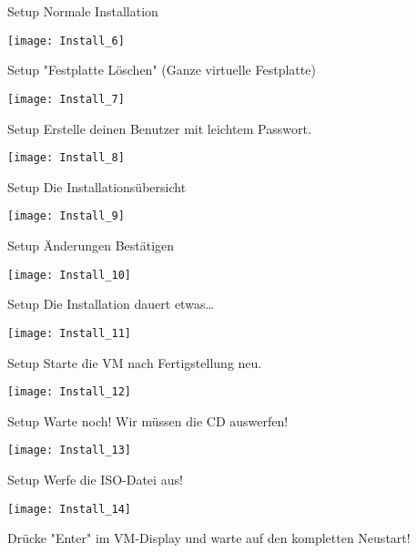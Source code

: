 \begin{frame}{Setup}
    Normale Installation
    \begin{center}
        \texttt{[image: Install\_6]}
    \end{center}
\end{frame}

\begin{frame}{Setup}
    "Festplatte Löschen" (Ganze virtuelle Festplatte)
    \begin{center}
        \texttt{[image: Install\_7]}
    \end{center}
\end{frame}

\begin{frame}{Setup}
    Erstelle deinen Benutzer mit leichtem Passwort.
    \begin{center}
        \texttt{[image: Install\_8]}
    \end{center}
\end{frame}

\begin{frame}{Setup}
    Die Installationsübersicht
    \begin{center}
        \texttt{[image: Install\_9]}
    \end{center}
\end{frame}

\begin{frame}{Setup}
    Änderungen Bestätigen
    \begin{center}
        \texttt{[image: Install\_10]}
    \end{center}
\end{frame}

\begin{frame}{Setup}
    Die Installation dauert etwas\dots
    \begin{center}
        \texttt{[image: Install\_11]}
    \end{center}
\end{frame}

\begin{frame}{Setup}
    Starte die VM nach Fertigstellung neu.
    \begin{center}
        \texttt{[image: Install\_12]}
    \end{center}
\end{frame}

\begin{frame}{Setup}
    Warte noch! Wir müssen die CD auswerfen!
    \begin{center}
        \texttt{[image: Install\_13]}
    \end{center}
\end{frame}

\begin{frame}{Setup}
    Werfe die ISO-Datei aus!
    \begin{center}
        \texttt{[image: Install\_14]}
    \end{center}
    Drücke "Enter" im VM-Display und warte auf den kompletten Neustart!
\end{frame}